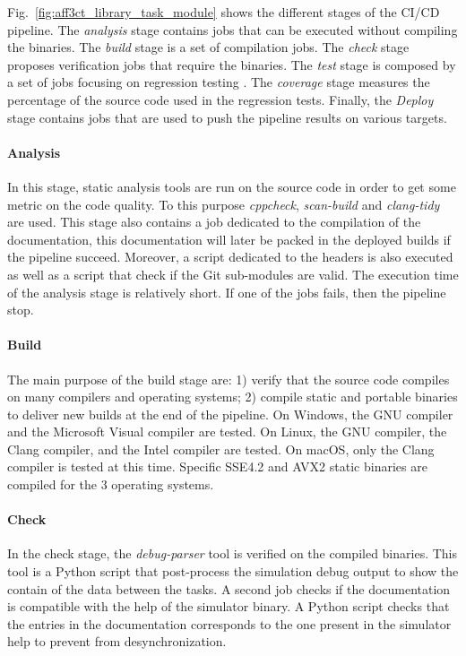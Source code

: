 Fig.~\ref{fig:aff3ct_library_task_module} shows the different stages of the
\AFFECT CI/CD pipeline. The \emph{analysis} stage contains jobs that can be
executed without compiling the \AFFECT binaries. The \emph{build} stage is a set
of compilation jobs. The \emph{check} stage proposes verification jobs that
require the \AFFECT binaries. The \emph{test} stage is composed by a set of jobs
focusing on regression testing . The \emph{coverage} stage measures the
percentage of the \AFFECT source code used in the regression tests. Finally, the
\emph{Deploy} stage contains jobs that are used to push the pipeline results on
various targets.

\paragraph{Analysis}

In this stage, static analysis tools are run on the \AFFECT source code
in order to get some metric on the code quality. To this purpose
\textit{cppcheck}, \textit{scan-build} and \textit{clang-tidy} are used. This
stage also contains a job dedicated to the compilation of the documentation,
this documentation will later be packed in the deployed builds if the pipeline
succeed. Moreover, a script dedicated to the \AFFECT headers is also executed as
well as a script that check if the Git sub-modules are valid. The execution time
of the analysis stage is relatively short. If one of the jobs fails, then the
pipeline stop.

\paragraph{Build}

The main purpose of the build stage are: 1) verify that the \AFFECT source code
compiles on many compilers and operating systems; 2) compile static and portable
binaries to deliver new builds at the end of the pipeline. On Windows, the GNU
compiler and the Microsoft Visual compiler are tested. On Linux, the GNU
compiler, the Clang compiler, and the Intel compiler are  tested. On macOS, only
the Clang compiler is tested at this time. Specific SSE4.2 and AVX2 static
binaries are compiled for the 3 operating systems.

\paragraph{Check}

In the check stage, the \emph{debug-parser} tool is verified on the compiled
\AFFECT binaries. This tool is a Python script that post-process the \AFFECT
simulation debug output to show the contain of the data between the tasks. A
second job checks if the documentation is compatible with the help of the
\AFFECT simulator binary. A Python script checks that the entries in the
documentation corresponds to the one present in the simulator help to prevent
from desynchronization.

